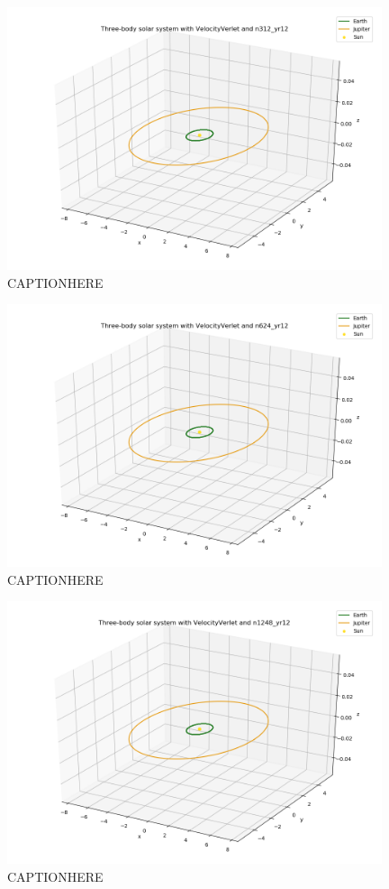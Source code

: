 \documentclass{article}
\begin{document}
    \begin{figure}[H]
        \centering
        \includegraphics[width = 11cm]{img/plot3D_S_E_J_V_n312_yr12.png}
        \caption{CAPTIONHERE}
        \label{fig:plot3D_S_E_J_V_n312_yr12}
    \end{figure}

    \begin{figure}[H]
        \centering
        \includegraphics[width = 11cm]{img/plot3D_S_E_J_V_n624_yr12.png}
        \caption{CAPTIONHERE}
        \label{fig:plot3D_S_E_J_V_624_yr12}
    \end{figure}

    \begin{figure}[H]
        \centering
        \includegraphics[width = 11cm]{img/plot3D_S_E_J_V_n1248_yr12.png}
        \caption{CAPTIONHERE}
        \label{fig:plot3D_S_E_J_V_n1248_yr12}
    \end{figure}
\end{document}
